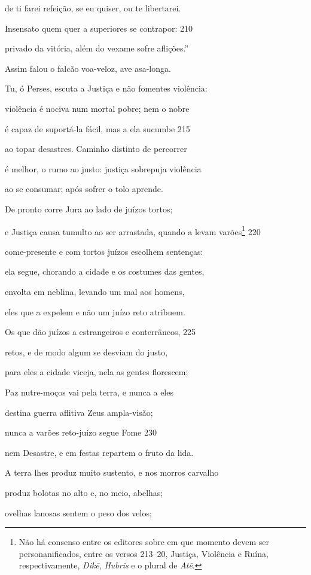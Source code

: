 de ti farei refeição, se eu quiser, ou te libertarei.

Insensato quem quer a superiores se contrapor: \num{210}

privado da vitória, além do vexame sofre aflições.''

Assim falou o falcão voa-veloz, ave asa-longa.

Tu, ó Perses, escuta a Justiça e não fomentes violência:

violência é nociva num mortal pobre; nem o nobre

é capaz de suportá-la fácil, mas a ela sucumbe \num{215}

ao topar desastres. Caminho distinto de percorrer

é melhor, o rumo ao justo: justiça sobrepuja violência

ao se consumar; após sofrer o tolo aprende.

De pronto corre Jura ao lado de juízos tortos;

e Justiça causa tumulto ao ser arrastada, quando a levam \qb{}varões\footnote{Não há consenso entre os editores sobre em que momento devem ser
personanificados, entre os versos 213--20, Justiça, Violência e Ruína,
respectivamente, \emph{Dikē}, \emph{Hubris} e o plural de \emph{Atē}.} \num{220}

come-presente e com tortos juízos escolhem sentenças:

ela segue, chorando a cidade e os costumes das gentes,

envolta em neblina, levando um mal aos homens,

eles que a expelem e não um juízo reto atribuem.

Os que dão juízos a estrangeiros e conterrâneos, \num{225}

retos, e de modo algum se desviam do justo,

para eles a cidade viceja, nela as gentes florescem;

Paz nutre-moços vai pela terra, e nunca a eles

destina guerra aflitiva Zeus ampla-visão;

nunca a varões reto-juízo segue Fome \num{230}

nem Desastre, e em festas repartem o fruto da lida.

A terra lhes produz muito sustento, e nos morros carvalho

produz bolotas no alto e, no meio, abelhas;

ovelhas lanosas sentem o peso dos velos;

